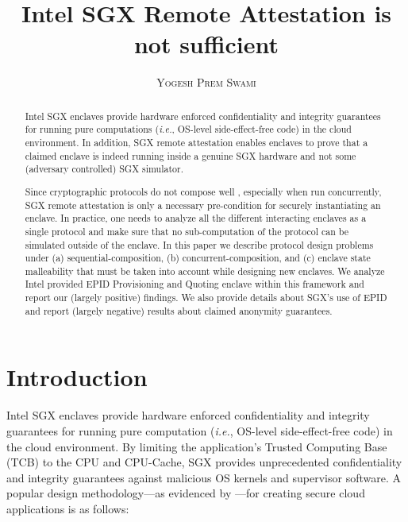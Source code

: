 \documentclass[letterpaper]{article}
\title{\bf Intel SGX Remote Attestation is not sufficient}
\author{\textsc{Yogesh Prem Swami}}
\date{\lastupdate}
\newcommand{\ie}{\textit{i.e.}}
\begin{document}

\maketitle

\begin{abstract}
  Intel SGX enclaves provide hardware enforced confidentiality and
  integrity guarantees for running pure computations (\ie, OS-level
  side-effect-free code) in the cloud environment. In addition, SGX
  remote attestation enables enclaves to prove that a claimed enclave
  is indeed running inside a genuine SGX hardware and not some
  (adversary controlled) SGX simulator.

  Since cryptographic protocols do not compose well
  \cite{cramerthesis,ucframework,gnuc}, especially when run
  concurrently, SGX remote attestation is only a necessary
  pre-condition for securely instantiating an enclave. In practice,
  one needs to analyze all the different interacting enclaves as a
  single protocol and make sure that no sub-computation of the
  protocol can be simulated outside of the enclave. In this paper we
  describe protocol design problems under (a) sequential-composition,
  (b) concurrent-composition, and (c) enclave state malleability that
  must be taken into account while designing new enclaves. We analyze
  Intel provided EPID \cite{epid} \textsf{Provisioning} and
  \textsf{Quoting} enclave \cite{sgxattest} within this framework and
  report our (largely positive) findings. We also provide details
  about SGX's use of EPID and report (largely negative) results about
  claimed anonymity guarantees.

\end{abstract}

\section{Introduction}
\label{sec:intro}
  Intel SGX enclaves\cite{sgxinnov, sgxinnov2} provide hardware
  enforced confidentiality and integrity guarantees for running pure
  computation (\textit{i.e.}, OS-level side-effect-free code) in the
  cloud environment. By limiting the application's Trusted Computing
  Base (TCB) to the CPU and CPU-Cache, SGX provides unprecedented
  confidentiality and integrity guarantees against malicious OS
  kernels and supervisor software. A popular design methodology---as
  evidenced by \cite{Haven, Graphene, Scone}---for creating secure
  cloud applications is as follows:
\end{document}
